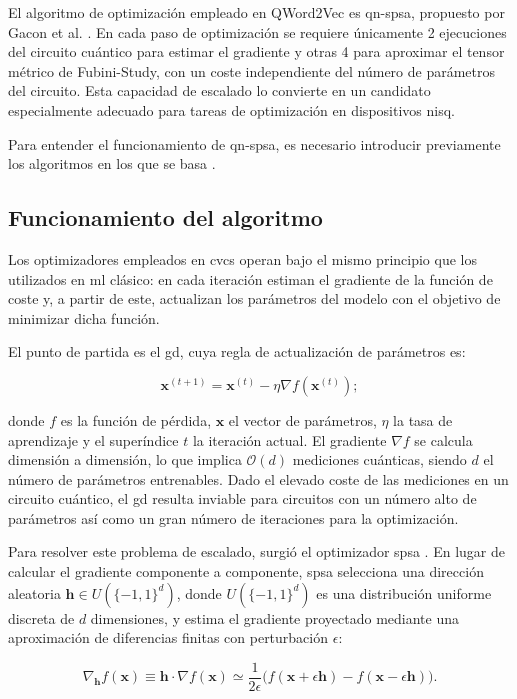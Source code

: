 El algoritmo de optimización empleado en QWord2Vec es \gls{qn-spsa}, propuesto por Gacon et al. \cite{gacon_qnspsa_2021}. En cada paso de optimización se requiere únicamente 2 ejecuciones del circuito cuántico para estimar el gradiente y otras 4 para aproximar el tensor métrico de Fubini-Study, con un coste independiente del número de parámetros del circuito. Esta capacidad de escalado lo convierte en un candidato especialmente adecuado para tareas de optimización en dispositivos \gls{nisq}.

Para entender el funcionamiento de \gls{qn-spsa}, es necesario introducir previamente los algoritmos en los que se basa \cite{duan_qnspsa_pennylane_2022}.

\subsection{Funcionamiento del algoritmo}

Los optimizadores empleados en \glspl{cvc} operan bajo el mismo principio que los utilizados en \gls{ml} clásico: en cada iteración estiman el gradiente de la función de coste y, a partir de este, actualizan los parámetros del modelo con el objetivo de minimizar dicha función.

El punto de partida es el \gls{gd}, cuya regla de actualización de parámetros es:

\[
  \mathbf{x}^{(t+1)} = \mathbf{x}^{(t)} - \eta \nabla f(\mathbf{x}^{(t)});
\]

donde $f$ es la función de pérdida, $\mathbf{x}$ el vector de parámetros, $\eta$ la tasa de aprendizaje y el superíndice $t$ la iteración actual. El gradiente $\nabla f$ se calcula dimensión a dimensión, lo que implica $\mathcal{O}(d)$ mediciones cuánticas, siendo $d$ el número de parámetros entrenables. Dado el elevado coste de las mediciones en un circuito cuántico, el \gls{gd} resulta inviable para circuitos con un número alto de parámetros así como un gran número de iteraciones para la optimización.

Para resolver este problema de escalado, surgió el optimizador \gls{spsa} \cite{wikipedia_spsa_2026}. En lugar de calcular el gradiente componente a componente, \gls{spsa} selecciona una dirección aleatoria $\mathbf{h} \in U(\{-1, 1\}^d)$, donde $U(\{-1, 1\}^d)$ es una distribución uniforme discreta de $d$ dimensiones, y estima el gradiente proyectado mediante una aproximación de diferencias finitas con perturbación $\epsilon$:

\[
  \nabla_{\mathbf{h}} f(\mathbf{x}) \equiv \mathbf{h} \cdot \nabla f(\mathbf{x}) \simeq \frac{1}{2\epsilon} \bigl(f(\mathbf{x} + \epsilon \mathbf{h}) - f(\mathbf{x} - \epsilon \mathbf{h})\bigr).
\]

